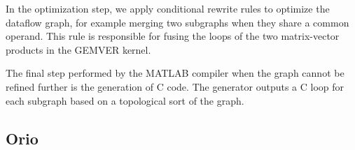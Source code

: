 \documentclass[runningheads]{llncs}
\begin{document}
In the optimization step, we apply conditional rewrite rules to optimize the
dataflow graph, for example merging two subgraphs when they share a common
operand.
This rule is responsible for fusing the loops of the two
matrix-vector products in the GEMVER kernel.  




The final step performed by the MATLAB compiler when the graph cannot be
refined further is the generation of C code. The generator outputs a C loop
for each subgraph based on a topological sort of the graph. 

\subsection{Orio}
\label{sec:orio}
\end{document}
